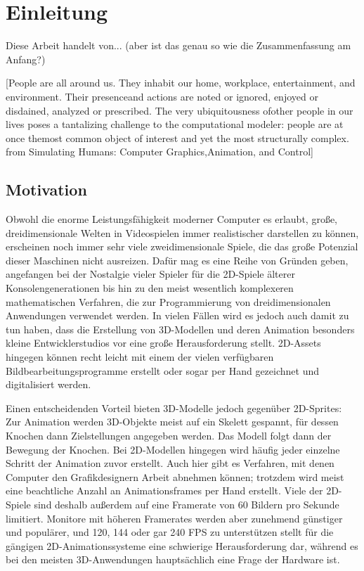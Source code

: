 \chapter{Einleitung}
Diese Arbeit handelt von... (aber ist das genau so wie die Zusammenfassung am Anfang?)

[People are all around us. They inhabit our home, workplace, entertainment, and environment. Their presenceand actions are noted or ignored, enjoyed or disdained, analyzed or prescribed. The very ubiquitousness ofother people in our lives poses a tantalizing challenge to the computational modeler: people are at once themost common object of interest and yet the most structurally complex. from Simulating Humans: Computer Graphics,Animation, and Control]

\section{Motivation}
Obwohl die enorme Leistungsfähigkeit moderner Computer es erlaubt, große, dreidimensionale Welten in Videospielen immer realistischer darstellen zu können, erscheinen noch immer sehr viele zweidimensionale Spiele, die das große Potenzial dieser Maschinen nicht ausreizen. Dafür mag es eine Reihe von Gründen geben, angefangen bei der Nostalgie vieler Spieler für die 2D-Spiele älterer Konsolengenerationen bis hin zu den meist wesentlich komplexeren mathematischen Verfahren, die zur Programmierung von dreidimensionalen Anwendungen verwendet werden. In vielen Fällen wird es jedoch auch damit zu tun haben, dass die Erstellung von 3D-Modellen und deren Animation besonders kleine Entwicklerstudios vor eine große Herausforderung stellt. 2D-Assets hingegen können recht leicht mit einem der vielen verfügbaren Bildbearbeitungsprogramme erstellt oder sogar per Hand gezeichnet und digitalisiert werden.

Einen entscheidenden Vorteil bieten 3D-Modelle jedoch gegenüber 2D-Sprites: Zur Animation werden 3D-Objekte meist auf ein Skelett gespannt, für dessen Knochen dann Zielstellungen angegeben werden. Das Modell folgt dann der Bewegung der Knochen. Bei 2D-Modellen hingegen wird häufig jeder einzelne Schritt der Animation zuvor erstellt. Auch hier gibt es Verfahren, mit denen Computer den Grafikdesignern Arbeit abnehmen können; trotzdem wird meist eine beachtliche Anzahl an Animationsframes per Hand erstellt. Viele der 2D-Spiele sind deshalb außerdem auf eine Framerate von 60 Bildern pro Sekunde limitiert. Monitore mit höheren Framerates werden aber zunehmend günstiger und populärer, und 120, 144 oder gar 240 FPS zu unterstützen stellt für die gängigen 2D-Animationssysteme eine schwierige Herausforderung dar, während es bei den meisten 3D-Anwendungen hauptsächlich eine Frage der Hardware ist.

